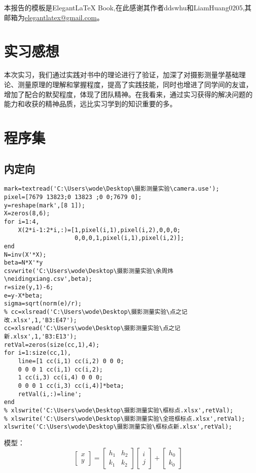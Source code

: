 本报告的模板是Elegant\LaTeX{} Book,在此感谢其作者ddswhu和LiamHuang0205,其邮箱为\url{elegantlatex@gmail.com}。

\section{实习感想}

本次实习，我们通过实践对书中的理论进行了验证，加深了对摄影测量学基础理论、测量原理的理解和掌握程度，提高了实践技能，同时也增进了同学间的友谊，增加了配合的默契程度，体现了团队精神。在我看来，通过实习获得的解决问题的能力和收获的精神品质，远比实习学到的知识重要的多。

\section{程序集}

\subsection{内定向}

\begin{lstlisting}[caption=nedingxiang.m文件]
mark=textread('C:\Users\wode\Desktop\摄影测量实验\camera.use');
pixel=[7679 13823;0 13823 ;0 0;7679 0];
y=reshape(mark',[8 1]);
X=zeros(8,6); 
for i=1:4,
    X(2*i-1:2*i,:)=[1,pixel(i,1),pixel(i,2),0,0,0;
                    0,0,0,1,pixel(i,1),pixel(i,2)];
end
N=inv(X'*X);
beta=N*X'*y
csvwrite('C:\Users\wode\Desktop\摄影测量实验\余周炜\neidingxiang.csv',beta);
r=size(y,1)-6;
e=y-X*beta;
sigma=sqrt(norm(e)/r);
% cc=xlsread('C:\Users\wode\Desktop\摄影测量实验\点之记改.xlsx',1,'B3:E47');
cc=xlsread('C:\Users\wode\Desktop\摄影测量实验\点之记新.xlsx',1,'B3:E13');
retVal=zeros(size(cc,1),4);
for i=1:size(cc,1),
    line=[1 cc(i,1) cc(i,2) 0 0 0;
    0 0 0 1 cc(i,1) cc(i,2);
    1 cc(i,3) cc(i,4) 0 0 0;
    0 0 0 1 cc(i,3) cc(i,4)]*beta;
    retVal(i,:)=line';
end
% xlswrite('C:\Users\wode\Desktop\摄影测量实验\框标点.xlsx',retVal);
% xlswrite('C:\Users\wode\Desktop\摄影测量实验\全班框标点.xlsx',retVal);
xlswrite('C:\Users\wode\Desktop\摄影测量实验\框标点新.xlsx',retVal);
\end{lstlisting}

模型：
\begin{equation}
\begin{bmatrix}
x \\ y
\end{bmatrix}
=\begin{bmatrix}
h_1 & h_2 \\
k_1 & k_2 
\end{bmatrix}
\begin{bmatrix}
i \\ j
\end{bmatrix}
+\begin{bmatrix}
h_0 \\ k_0
\end{bmatrix}
\end{equation}


